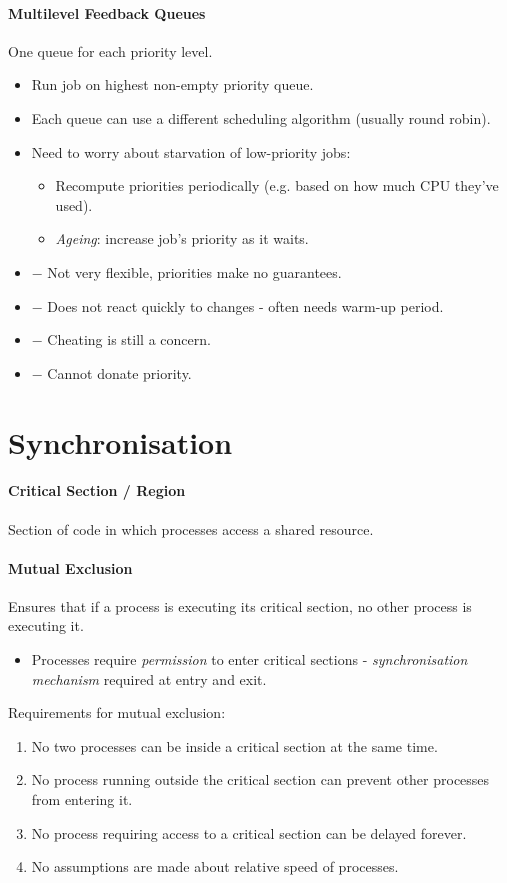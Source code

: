 \documentclass[twocolumn,english]{article}
\begin{document}
\paragraph{Multilevel Feedback Queues}

One queue for each priority level.
\begin{itemize}
\item Run job on highest non-empty priority queue.
\item Each queue can use a different scheduling algorithm (usually round
robin).
\item Need to worry about starvation of low-priority jobs:
\begin{itemize}
\item Recompute priorities periodically (e.g. based on how much CPU they've
used).
\item \emph{Ageing}: increase job's priority as it waits.
\end{itemize}
\item $-$ Not very flexible, priorities make no guarantees.
\item $-$ Does not react quickly to changes - often needs warm-up period.
\item $-$ Cheating is still a concern.
\item $-$ Cannot donate priority.
\end{itemize}

\section{Synchronisation}

\paragraph{Critical Section / Region}

Section of code in which processes access a shared resource.

\paragraph{Mutual Exclusion}

Ensures that if a process is executing its critical section, no other
process is executing it.
\begin{itemize}
\item Processes require \emph{permission} to enter critical sections - \emph{synchronisation
mechanism} required at entry and exit.
\end{itemize}
Requirements for mutual exclusion:
\begin{enumerate}
\item No two processes can be inside a critical section at the same time.
\item No process running outside the critical section can prevent other
processes from entering it.
\item No process requiring access to a critical section can be delayed forever.
\item No assumptions are made about relative speed of processes.
\end{enumerate}
\end{document}
